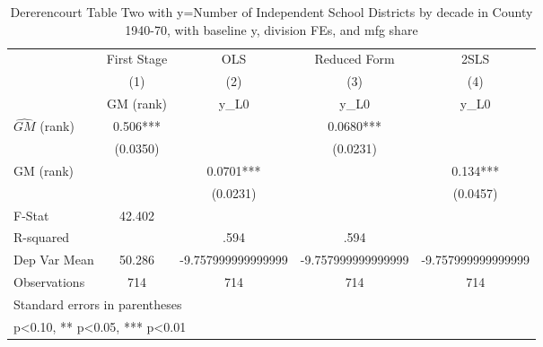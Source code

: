 \begin{table}[htbp]\centering
\def\sym#1{\ifmmode^{#1}\else\(^{#1}\)\fi}
\caption{Dererencourt Table Two with y=Number of Independent School Districts by decade in County 1940-70, with baseline y, division FEs, and mfg share}
\begin{tabular}{l*{4}{c}}
\toprule
                    & First Stage   &         OLS   &Reduced Form   &        2SLS   \\
                    &\multicolumn{1}{c}{(1)}&\multicolumn{1}{c}{(2)}&\multicolumn{1}{c}{(3)}&\multicolumn{1}{c}{(4)}\\
                    &\multicolumn{1}{c}{GM  (rank)}&\multicolumn{1}{c}{y\_L0}&\multicolumn{1}{c}{y\_L0}&\multicolumn{1}{c}{y\_L0}\\
\midrule
$\hat{GM}$ (rank)   &       0.506***&               &      0.0680***&               \\
                    &    (0.0350)   &               &    (0.0231)   &               \\
\addlinespace
GM  (rank)          &               &      0.0701***&               &       0.134***\\
                    &               &    (0.0231)   &               &    (0.0457)   \\
\midrule
F-Stat              &      42.402   &               &               &               \\
R-squared           &               &        .594   &        .594   &               \\
Dep Var Mean        &      50.286   &-9.757999999999999   &-9.757999999999999   &-9.757999999999999   \\
Observations        &         714   &         714   &         714   &         714   \\
\bottomrule
\multicolumn{5}{l}{\footnotesize Standard errors in parentheses}\\
\multicolumn{5}{l}{\footnotesize * p<0.10, ** p<0.05, *** p<0.01}\\
\end{tabular}
\end{table}
